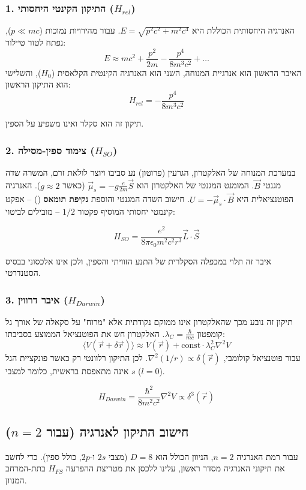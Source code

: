 \subsubsection{1. התיקון הקינטי היחסותי ($H_{rel}$)}
האנרגיה היחסותית הכוללת היא $E = \sqrt{p^2c^2 + m^2c^4}$. עבור מהירויות נמוכות ($p \ll mc$), נפתח לטור טיילור:
\[ E \approx mc^2 + \frac{p^2}{2m} - \frac{p^4}{8m^3c^2} + \dots \]
האיבר הראשון הוא אנרגיית המנוחה, השני הוא האנרגיה הקינטית הקלאסית ($H_0$), והשלישי הוא התיקון הראשון:
\[ H_{rel} = -\frac{p^4}{8m^3c^2} \]

תיקון זה הוא סקלר ואינו משפיע על הספין.

\subsubsection{2. צימוד ספין-מסילה ($H_{SO}$)}
במערכת המנוחה של האלקטרון, הגרעין (פרוטון) נע סביבו ויוצר לולאת זרם, המשרה שדה מגנטי $\vec{B}$.
המומנט המגנטי של האלקטרון הוא $\vec{\mu}_s = -g \frac{e}{2m} \vec{S}$ (כאשר $g \approx 2$).
האנרגיה הפוטנציאלית היא $U = -\vec{\mu}_s \cdot \vec{B}$.
חישוב השדה המגנטי והוספת \textbf{נקיפת תומאס} () – אפקט קינמטי יחסותי המוסיף פקטור $1/2$ – מובילים לביטוי:

\[ H_{SO} = \frac{e^2}{8\pi\epsilon_0 m^2 c^2 r^3} \vec{L} \cdot \vec{S} \]

איבר זה תלוי במכפלה הסקלרית של התנע הזוויתי והספין, ולכן אינו אלכסוני בבסיס הסטנדרטי.

\subsubsection{3. איבר דרווין ($H_{Darwin}$)}
תיקון זה נובע מכך שהאלקטרון אינו ממוקם נקודתית אלא "מרוח" על סקאלה של אורך גל קומפטון $\lambda_C = \frac{\hbar}{mc}$. האלקטרון חש את הפוטנציאל הממוצע בסביבתו:
\[ \langle V(\vec{r} + \delta\vec{r}) \rangle \approx V(\vec{r}) + \text{const} \cdot \lambda_C^2 \nabla^2 V \]
עבור פוטנציאל קולומבי, $\nabla^2(1/r) \propto \delta(\vec{r})$. לכן התיקון רלוונטי רק כאשר פונקציית הגל אינה מתאפסת בראשית, כלומר למצבי $s$ ($l=0$).

\[ H_{Darwin} = \frac{\hbar^2}{8m^2c^2} \nabla^2 V \propto \delta^3(\vec{r}) \]

\subsection{חישוב התיקון לאנרגיה (עבור $n=2$)}

עבור רמת האנרגיה $n=2$, הניוון הכולל הוא $D=8$ (מצבי $2s$ ו-$2p$, כולל ספין).
כדי לחשב את תיקוני האנרגיה מסדר ראשון, עלינו ללכסן את מטריצת ההפרעה $H_{FS}$ בתת-המרחב המנוון.

